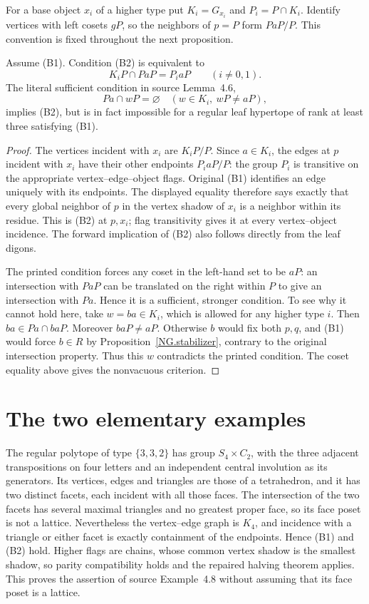 For a base object $x_i$ of a higher type put $K_i=G_{x_i}$ and
$P_i=P\cap K_i$. Identify vertices with left cosets $gP$, so
the neighbors of $p=P$ form $PaP/P$. This convention is fixed
throughout the next proposition.

\begin{proposition}\label{NG.B2}
Assume (B1). Condition (B2) is equivalent to
\[
                   K_iP\cap PaP=P_i aP\qquad(i\ne0,1).
\]
The literal sufficient condition in source Lemma~4.6,
\[
 Pa\cap wP=\varnothing\quad
 (w\in K_i,\ wP\ne aP),
\]
implies (B2), but is in fact impossible for a regular leaf hypertope
of rank at least three satisfying (B1).
\end{proposition}
\begin{proof}
The vertices incident with $x_i$ are $K_iP/P$. Since $a\in K_i$,
the edges at $p$ incident with $x_i$ have their other endpoints
$P_i aP/P$: the group $P_i$ is transitive on the appropriate
vertex--edge--object flags. Original (B1) identifies an edge
uniquely with its endpoints. The displayed equality therefore
says exactly that every global neighbor of $p$ in the vertex
shadow of $x_i$ is a neighbor within its residue. This is (B2)
at $p,x_i$; flag transitivity gives it at every vertex--object
incidence. The forward implication of (B2) also follows directly
from the leaf digons.

The printed condition forces any coset in the left-hand set to
be $aP$: an intersection with $PaP$ can be translated on the
right within $P$ to give an intersection with $Pa$. Hence it is
a sufficient, stronger condition. To see why it cannot hold here,
take $w=ba\in K_i$, which is allowed for any higher type $i$.
Then $ba\in Pa\cap baP$. Moreover $baP\ne aP$. Otherwise $b$
would fix both $p,q$, and (B1) would force $b\in R$ by
Proposition~\ref{NG.stabilizer}, contrary to the original intersection
property. Thus this $w$ contradicts the printed condition. The
coset equality above gives the nonvacuous criterion.
\end{proof}

\section{The two elementary examples}
The regular polytope of type $\{3,3,2\}$ has group $S_4\times C_2$,
with the three adjacent transpositions on four letters and an independent
central involution as its generators. Its vertices, edges and triangles
are those of a tetrahedron, and it has two distinct facets, each incident
with all those faces. The intersection of the two facets has several
maximal triangles and no greatest proper face, so its face poset is
not a lattice. Nevertheless the vertex--edge graph is $K_4$, and
incidence with a triangle or either facet is exactly containment of
the endpoints. Hence (B1) and (B2) hold. Higher flags are chains,
whose common vertex shadow is the smallest shadow, so parity
compatibility holds and the repaired halving theorem applies.
This proves the assertion of source Example~4.8 without assuming
that its face poset is a lattice.

